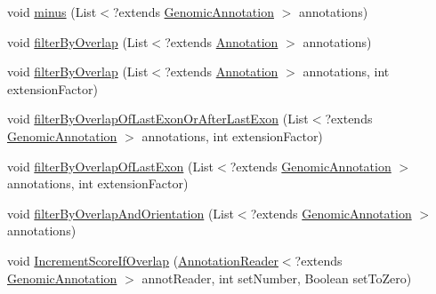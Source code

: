 \begin{DoxyCompactItemize}
\item 
void \hyperlink{classbroad_1_1core_1_1annotation_1_1_annotation_reader_3_01_t_01extends_01_genomic_annotation_01_4_a2b33aa194c4242e1434063c7e5168236}{minus} (List$<$?extends \hyperlink{interfacebroad_1_1core_1_1annotation_1_1_genomic_annotation}{Genomic\+Annotation} $>$ annotations)
\item 
void \hyperlink{classbroad_1_1core_1_1annotation_1_1_annotation_reader_3_01_t_01extends_01_genomic_annotation_01_4_a18d1a6a3a4f71fc0b6a199a27d4e0719}{filter\+By\+Overlap} (List$<$?extends \hyperlink{interfaceumms_1_1core_1_1annotation_1_1_annotation}{Annotation} $>$ annotations)
\item 
void \hyperlink{classbroad_1_1core_1_1annotation_1_1_annotation_reader_3_01_t_01extends_01_genomic_annotation_01_4_a76a7dda18840146b8295077897fc7eb7}{filter\+By\+Overlap} (List$<$?extends \hyperlink{interfaceumms_1_1core_1_1annotation_1_1_annotation}{Annotation} $>$ annotations, int extension\+Factor)
\item 
void \hyperlink{classbroad_1_1core_1_1annotation_1_1_annotation_reader_3_01_t_01extends_01_genomic_annotation_01_4_a42737999d939d66d1f0087e493eeee94}{filter\+By\+Overlap\+Of\+Last\+Exon\+Or\+After\+Last\+Exon} (List$<$?extends \hyperlink{interfacebroad_1_1core_1_1annotation_1_1_genomic_annotation}{Genomic\+Annotation} $>$ annotations, int extension\+Factor)
\item 
void \hyperlink{classbroad_1_1core_1_1annotation_1_1_annotation_reader_3_01_t_01extends_01_genomic_annotation_01_4_a14a0871b93a66e22843af25ef49662d5}{filter\+By\+Overlap\+Of\+Last\+Exon} (List$<$?extends \hyperlink{interfacebroad_1_1core_1_1annotation_1_1_genomic_annotation}{Genomic\+Annotation} $>$ annotations, int extension\+Factor)
\item 
void \hyperlink{classbroad_1_1core_1_1annotation_1_1_annotation_reader_3_01_t_01extends_01_genomic_annotation_01_4_afb53a50da4cd365f50d609d82a6ee2e1}{filter\+By\+Overlap\+And\+Orientation} (List$<$?extends \hyperlink{interfacebroad_1_1core_1_1annotation_1_1_genomic_annotation}{Genomic\+Annotation} $>$ annotations)
\item 
void \hyperlink{classbroad_1_1core_1_1annotation_1_1_annotation_reader_3_01_t_01extends_01_genomic_annotation_01_4_aae2b5bec9ccbb0c1dca631c44fc03d7a}{Increment\+Score\+If\+Overlap} (\hyperlink{classbroad_1_1core_1_1annotation_1_1_annotation_reader_3_01_t_01extends_01_genomic_annotation_01_4_adc7b77cf9681958941014c7b460dbb9f}{Annotation\+Reader}$<$?extends \hyperlink{interfacebroad_1_1core_1_1annotation_1_1_genomic_annotation}{Genomic\+Annotation} $>$ annot\+Reader, int set\+Number, Boolean set\+To\+Zero)

\end{DoxyCompactItemize}
